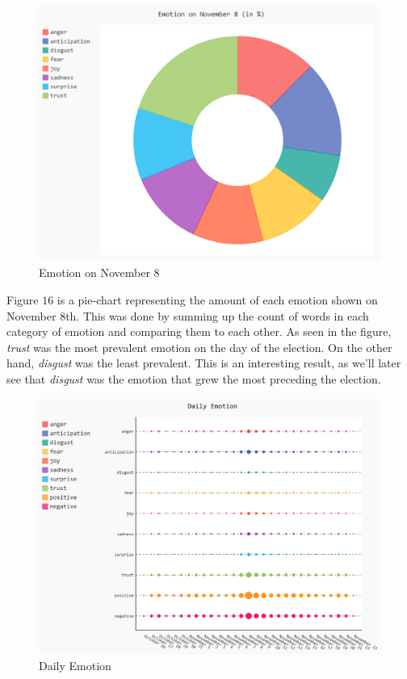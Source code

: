 \documentclass[letterpaper]{article}
\begin{document}
\begin{figure}[!htb]
\begin{center}
\includegraphics[scale=0.38]{emotion-on-nov-8.PNG}
\caption{Emotion on November 8}
\label{fig1}
\end{center}
\end{figure}

Figure $16$ is a pie-chart representing the amount of each emotion shown on November $8$th. This was done by summing up the count of words in each category of emotion and comparing them to each other. As seen in the figure, \textit{trust} was the most prevalent emotion on the day of the election. On the other hand, \textit{disgust} was the least prevalent. This is an interesting result, as we'll later see that \textit{disgust} was the emotion that grew the most preceding the election.

\begin{figure}[!htb]
\begin{center}
\includegraphics[scale=0.3]{daily-emotion-all.PNG}
\caption{Daily Emotion}
\label{fig1}
\end{center}
\end{figure}
\end{document}
